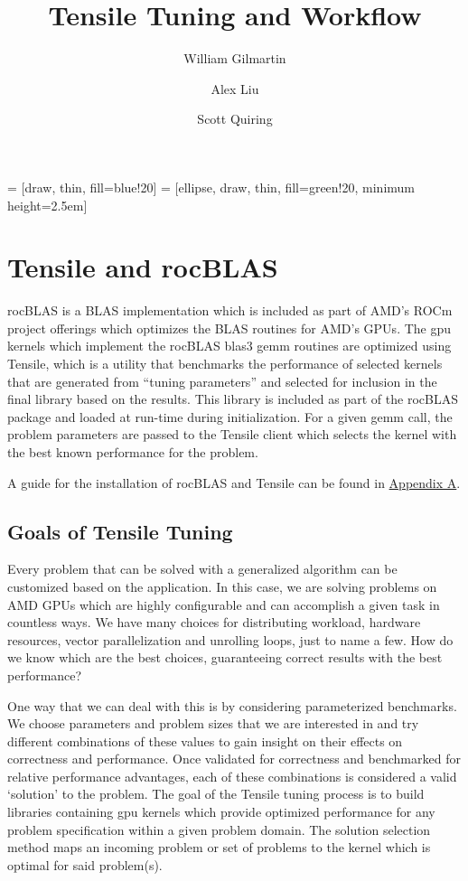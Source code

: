 \documentclass[]{article}
\title{Tensile Tuning and Workflow}
\author{William Gilmartin \and Alex Liu \and Scott Quiring}
\begin{document}
\maketitle

\newpage

\tableofcontents



 = [draw, thin, fill=blue!20]
 = [ellipse, draw, thin, fill=green!20, minimum height=2.5em]

\section{Tensile and rocBLAS}


rocBLAS is a BLAS implementation which is included as part of AMD's ROCm project offerings which optimizes the BLAS routines for AMD's GPUs. The gpu kernels which implement the rocBLAS blas3 gemm routines are optimized using Tensile, which is a utility that benchmarks the performance of selected kernels that are generated from ``tuning parameters'' and selected for inclusion in the final library based on the results. This library is included as part of the rocBLAS package and loaded at run-time during initialization. For a given gemm call, the problem parameters are passed to the Tensile client which selects the kernel with the best known performance for the problem.


A guide for the installation of rocBLAS and Tensile can be found in \hyperref[sec:appendixA]{Appendix A}.

\subsection{Goals of Tensile Tuning}

Every problem that can be solved with a generalized algorithm can be customized based on the application. In this case, we are solving problems on AMD GPUs which are highly configurable and can accomplish a given task in countless ways. We have many choices for distributing workload, hardware resources, vector parallelization and unrolling loops, just to name a few. How do we know which are the best choices, guaranteeing correct results with the best performance?

One way that we can deal with this is by considering parameterized benchmarks. We choose parameters and problem sizes that we are interested in and try different combinations of these values to gain insight on their effects on correctness and performance. Once validated for correctness and benchmarked for relative performance advantages, each of these combinations is considered a valid `solution' to the problem. The goal of the Tensile tuning process is to build libraries containing gpu kernels which provide optimized performance for any problem specification within a given problem domain. The solution selection method maps an incoming problem or set of problems to the kernel which is optimal for said problem(s).
\end{document}
